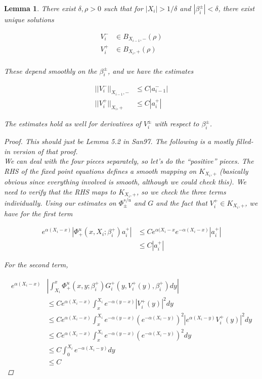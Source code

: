 \documentclass[12pt]{article}
\newtheorem{lemma}{Lemma}
\begin{document}
\begin{lemma}
There exist $\delta, \rho > 0$ such that for $|X_i| > 1/\delta$ and $|\beta_i^\pm| < \delta$, there exist unique solutions

\begin{align*}
V_i^- &\in B_{X_{i-1}, -}(\rho) \\
V_i^+ &\in B_{X_i, +}(\rho) \\
\end{align*}

These depend smoothly on the $\beta_i^\pm$, and we have the estimates

\begin{align*}
||V_i^-||_{X_{i-1}, -} &\leq C |a_{i-1}^-| \\
||V_i^+||_{X_i, +} &\leq C |a_i^+|
\end{align*}

The estimates hold as well for derivatives of $V_i^\pm$ with respect to $\beta_i^\pm$.

\begin{proof}
This should just be Lemma 5.2 in San97. The following is a mostly filled-in version of that proof.\\

We can deal with the four pieces separately, so let's do the ``positive'' pieces. The RHS of the fixed point equations defines a smooth mapping on $K_{X_i, +}$ (basically obvious since everything involved is smooth, although we could check this). We need to verify that the RHS maps to $K_{X_i, +}$, so we check the three terms individually. Using our estimates on $\Phi^{s/u}_\pm$ and $G$ and the fact that $V_i^+ \in K_{X_i, +}$, we have for the first term

\begin{align*}
e^{\alpha(X_i - x)} | \Phi^u_+(x, X_i; \beta_i^+) a_i^+ | 
&\leq C e^{\alpha(X_i - x} e^{-\alpha(X_i - x)} |a_i^+| \\
&\leq C |a_i^+|
\end{align*}

For the second term,

\begin{align*}
e^{\alpha(X_i - x)} &\left| \int_{X_i}^x \Phi_+^u(x, y; \beta_i^+) G_i^+(y, V_i^+(y),\beta_i^+)dy  \right| \\
&\leq C e^{\alpha(X_i - x)} \int_x^{X_i} e^{-\alpha(y - x)}|V_i^+(y)|^2 dy \\
&\leq C e^{\alpha(X_i - x)} \int_x^{X_i} 
e^{-\alpha(y - x)}(e^{-\alpha(X_i - y)})^2|e^{\alpha(X_i - y)} V_i^+(y)|^2 dy \\
&\leq C e^{\alpha(X_i - x)} \int_x^{X_i} 
e^{-\alpha(y - x)}(e^{-\alpha(X_i - y)})^2 dy \\
&\leq C \int_0^{X_i} e^{-\alpha (X_i - y)} dy \\
&\leq C
\end{align*}


\end{proof}
\end{lemma}
\end{document}
